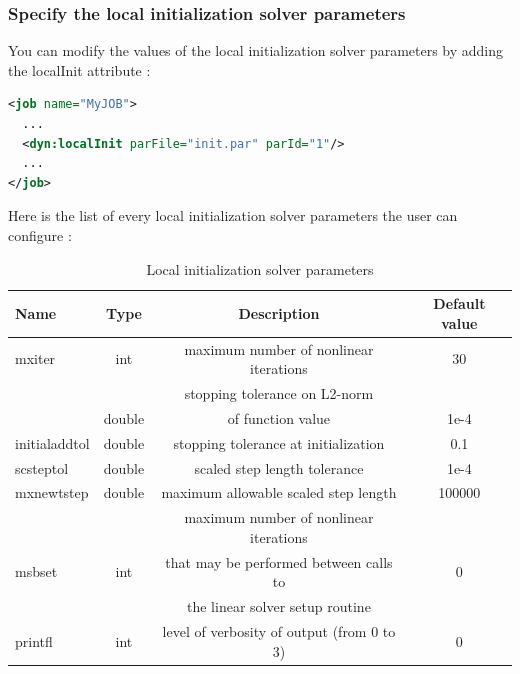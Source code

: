\documentclass[a4paper, 12pt]{report}
\begin{document}
\subsubsection{Specify the local initialization solver parameters}

You can modify the values of the local initialization solver parameters by adding the localInit attribute :

\begin{lstlisting}[language=XML]
<job name="MyJOB">
  ...
  <dyn:localInit parFile="init.par" parId="1"/>
  ...
</job>
\end{lstlisting}

Here is the list of every local initialization solver parameters the user can configure :

\begin{table}[H]
\center
\begin{tabular}{ l | c | c | c }
\toprule
\textbf{{Name}} & \textbf{{Type}} & \textbf{{Description}} & \textbf{{Default value}}\\
\midrule
\rowcolor{white}
\small{mxiter} & \small{int} & \small{maximum number of nonlinear iterations} & \small{30} \\
\rowcolor{gray!10}
 &  & \small{stopping tolerance on L2-norm} &  \\
\rowcolor{gray!10}
\multirow{-2}{*}{\small{fnormtol}} & \multirow{-2}{*}{\small{double}} & \small{of function value} & \multirow{-2}{*}{\small{1e-4}} \\
\rowcolor{white}
\small{initialaddtol} & \small{double} & \small{stopping tolerance at initialization} & \small{0.1} \\
\rowcolor{gray!10}
\small{scsteptol} & \small{double} & \small{scaled step length tolerance} & \small{1e-4} \\
\rowcolor{white}
\small{mxnewtstep} & \small{double} & \small{maximum allowable scaled step length} & \small{100000} \\
\rowcolor{gray!10}
 &  & \small{maximum number of nonlinear iterations} &  \\
\rowcolor{gray!10}
\small{msbset} & \small{int} & \small{that may be performed between calls to} & \small{0} \\
\rowcolor{gray!10}
 &  & \small{the linear solver setup routine} &  \\
 \rowcolor{gray!10}
\rowcolor{white}
\small{printfl} & \small{int} & \small{level of verbosity of output (from 0 to 3)} & \small{0} \\
\bottomrule
\end{tabular}
\caption{Local initialization solver parameters}
\end{table}
\end{document}
